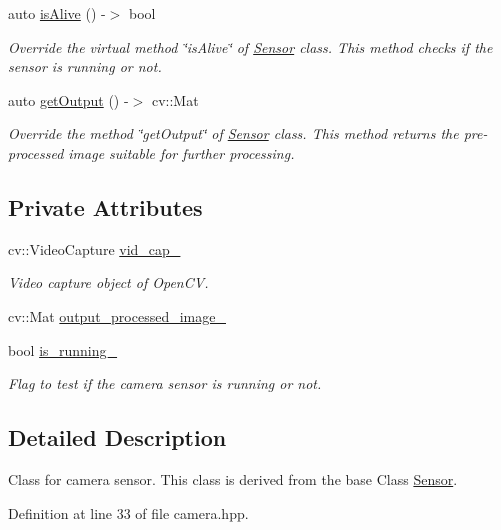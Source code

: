 \begin{DoxyCompactItemize}
auto \hyperlink{class_camera_a1b3b1ece3344ea84754aff31f048d55e}{is\+Alive} () -\/$>$ bool
\begin{DoxyCompactList}\small\item\em Override the virtual method \char`\"{}is\+Alive\char`\"{} of \hyperlink{class_sensor}{Sensor} class. This method checks if the sensor is running or not. \end{DoxyCompactList}\item 
auto \hyperlink{class_camera_a456e3f62048f2266e098489a068bda0e}{get\+Output} () -\/$>$ cv\+::\+Mat
\begin{DoxyCompactList}\small\item\em Override the method \char`\"{}get\+Output\char`\"{} of \hyperlink{class_sensor}{Sensor} class. This method returns the pre-\/processed image suitable for further processing. \end{DoxyCompactList}\end{DoxyCompactItemize}
\subsection*{Private Attributes}
\begin{DoxyCompactItemize}
\item 
cv\+::\+Video\+Capture \hyperlink{class_camera_a264c7dfa5dd39176aedbb742f34ba1eb}{vid\+\_\+cap\+\_\+}
\begin{DoxyCompactList}\small\item\em Video capture object of Open\+CV. \end{DoxyCompactList}\item 
cv\+::\+Mat \hyperlink{class_camera_ae96ea8feb337852401830c24af293025}{output\+\_\+processed\+\_\+image\+\_\+}
\item 
bool \hyperlink{class_camera_a24d141601f7d0330b77b86505851bd0d}{is\+\_\+running\+\_\+}
\begin{DoxyCompactList}\small\item\em Flag to test if the camera sensor is running or not. \end{DoxyCompactList}\end{DoxyCompactItemize}


\subsection{Detailed Description}
Class for camera sensor. This class is derived from the base Class \hyperlink{class_sensor}{Sensor}. 

Definition at line 33 of file camera.\+hpp.



